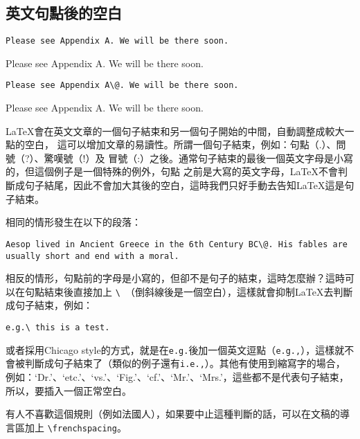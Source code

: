 \subsection{英文句點後的空白}

\begin{Wrong}
\begin{verbatim}
Please see Appendix A. We will be there soon.
\end{verbatim}
Please see Appendix A. We will be there soon.
\end{Wrong}

\begin{Right}
\begin{verbatim}
Please see Appendix A\@. We will be there soon.
\end{verbatim}
Please see Appendix A\@. We will be there soon.
\end{Right}

\LaTeX 會在英文文章的一個句子結束和另一個句子開始的中間，自動調整成較大一點的空白，
這可以增加文章的易讀性。所謂一個句子結束，例如：句點（.）、問號（?）、驚嘆號（!）及
冒號（:）之後。通常句子結束的最後一個英文字母是小寫的，但這個例子是一個特殊的例外，句點
之前是大寫的英文字母，\LaTeX 不會判斷成句子結尾，因此不會加大其後的空白，這時我們只好手動去告知\LaTeX 這是句子結束。

相同的情形發生在以下的段落：

\begin{Code}
\small
{}
\begin{verbatim}
Aesop lived in Ancient Greece in the 6th Century BC\@. His fables are
usually short and end with a moral.
\end{verbatim}
\end{Code}

相反的情形，句點前的字母是小寫的，但卻不是句子的結束，這時怎麼辦？這時可以在句點結束後直接加上 \verb|\ |（倒斜線後是一個空白），這樣就會抑制\LaTeX 去判斷成句子結束，例如：

\begin{Code}
\small
\begin{verbatim}
e.g.\ this is a test.
\end{verbatim}
\end{Code}

或者採用Chicago style的方式，就是在{\tt e.g.}後加一個英文逗點（{\tt e.g.,}），這樣就不會被判斷成句子結束了（類似的例子還有{\tt i.e.,}）。其他有使用到縮寫字的場合，例如：`Dr.'、`etc.'、`vs.'、`Fig.'、`cf.'、`Mr.'、`Mrs.'，這些都不是代表句子結束，所以，要插入一個正常空白。

有人不喜歡這個規則（例如法國人），如果要中止這種判斷的話，可以在文稿的導言區加上 \verb|\frenchspacing|。

\marginpar{\back}
